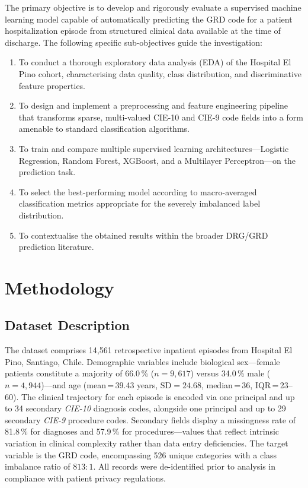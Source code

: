 \documentclass[journal]{IEEEtran}
\begin{document}
The primary objective is to develop and rigorously evaluate a
supervised machine learning model capable of automatically
predicting the GRD code for a patient hospitalization episode
from structured clinical data available at the time of discharge.
The following specific sub-objectives guide the investigation:

\begin{enumerate}[label=(\roman*), leftmargin=*, itemsep=2pt]
  \item To conduct a thorough exploratory data analysis (EDA)
        of the Hospital El Pino cohort, characterising data
        quality, class distribution, and discriminative feature
        properties.
  \item To design and implement a preprocessing and feature
        engineering pipeline that transforms sparse,
        multi-valued CIE-10 and CIE-9 code fields into a form
        amenable to standard classification algorithms.
  \item To train and compare multiple supervised learning
        architectures---Logistic Regression, Random Forest,
        XGBoost, and a Multilayer Perceptron---on the
        prediction task.
  \item To select the best-performing model according to
        macro-averaged classification metrics appropriate for
        the severely imbalanced label distribution.
  \item To contextualise the obtained results within the
        broader DRG/GRD prediction literature.
\end{enumerate}

\section{Methodology}
\label{sec:methodology}

\subsection{Dataset Description}

The dataset comprises 14,561 retrospective inpatient episodes
from Hospital El Pino, Santiago, Chile.  Demographic variables
include biological sex---female patients constitute a majority
of 66.0\,\% ($n{=}9{,}617$) versus 34.0\,\% male
($n{=}4{,}944$)---and age (mean\,=\,39.43 years,
$\mathrm{SD}{=}24.68$, median\,=\,36, IQR\,=\,23--60).  The
clinical trajectory for each episode is encoded via one
principal and up to 34 secondary \emph{CIE-10} diagnosis codes,
alongside one principal and up to 29 secondary \emph{CIE-9}
procedure codes.  Secondary fields display a missingness rate
of 81.8\,\% for diagnoses and 57.9\,\% for procedures---values
that reflect intrinsic variation in clinical complexity rather
than data entry deficiencies.  The target variable is the GRD
code, encompassing 526 unique categories with a class imbalance
ratio of $813{:}1$.  All records were de-identified prior to
analysis in compliance with patient privacy regulations.
\end{document}
